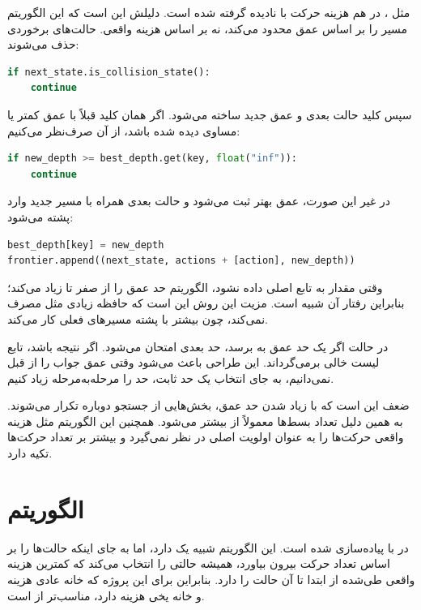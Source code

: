 \documentclass[10.5pt]{exam}
\begin{document}
مثل
، در
هم هزینه حرکت با
\lr{\_}
نادیده گرفته شده است. دلیلش این است که این الگوریتم مسیر را بر اساس عمق محدود می‌کند، نه بر اساس هزینه واقعی. حالت‌های برخوردی حذف می‌شوند:

\begin{latin}
\begin{lstlisting}[language=Python]
if next_state.is_collision_state():
    continue
\end{lstlisting}
\end{latin}

سپس کلید حالت بعدی و عمق جدید ساخته می‌شود. اگر همان کلید قبلاً با عمق کمتر یا مساوی دیده شده باشد، از آن صرف‌نظر می‌کنیم:

\begin{latin}
\begin{lstlisting}[language=Python]
if new_depth >= best_depth.get(key, float("inf")):
    continue
\end{lstlisting}
\end{latin}

در غیر این صورت، عمق بهتر ثبت می‌شود و حالت بعدی همراه با مسیر جدید وارد پشته می‌شود:

\begin{latin}
\begin{lstlisting}[language=Python]
best_depth[key] = new_depth
frontier.append((next_state, actions + [action], new_depth))
\end{lstlisting}
\end{latin}

وقتی مقدار
به تابع اصلی داده نشود، الگوریتم حد عمق را از صفر تا
زیاد می‌کند؛ بنابراین رفتار آن شبیه
است. مزیت این روش این است که حافظه زیادی مثل
مصرف نمی‌کند، چون بیشتر با پشته مسیرهای فعلی کار می‌کند.

در حالت
اگر یک حد عمق به
برسد، حد بعدی امتحان می‌شود. اگر نتیجه
باشد، تابع لیست خالی برمی‌گرداند. این طراحی باعث می‌شود وقتی عمق جواب را از قبل نمی‌دانیم، به جای انتخاب یک حد ثابت، حد را مرحله‌به‌مرحله زیاد کنیم.

ضعف
این است که با زیاد شدن حد عمق، بخش‌هایی از جستجو دوباره تکرار می‌شوند. به همین دلیل تعداد بسط‌ها معمولاً از
بیشتر می‌شود. همچنین این الگوریتم مثل
هزینه واقعی حرکت‌ها را به عنوان اولویت اصلی در نظر نمی‌گیرد و بیشتر بر تعداد حرکت‌ها تکیه دارد.

\section{الگوریتم }
در
با
پیاده‌سازی شده است. این الگوریتم شبیه
یک
دارد، اما به جای اینکه حالت‌ها را بر اساس تعداد حرکت بیرون بیاورد، همیشه حالتی را انتخاب می‌کند که کمترین هزینه واقعی طی‌شده از ابتدا تا آن حالت را دارد. بنابراین برای این پروژه که خانه عادی هزینه
و خانه یخی هزینه
دارد،
مناسب‌تر از
است.
\end{document}
